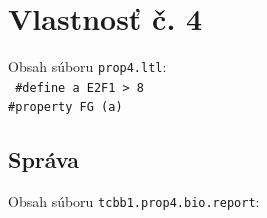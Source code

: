 \documentclass[11pt,final,oneside]{fithesis}
\begin{document}
\chapter{Vlastnos\v t \v c. 4}
\label{sec:caseProp4File}
Obsah s\'uboru {\tt prop4.ltl}:\\

{\tt
\noindent
\#define a E2F1 > 8\\

\noindent
\#property FG (a)\\

}

\section{Spr\'ava}
\label{sec:prop4report}
Obsah s\'uboru {\tt tcbb1.prop4.bio.report}:\\
\end{document}

